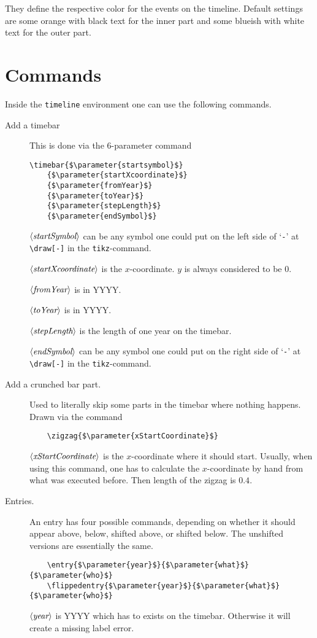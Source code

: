 \documentclass{article}
\newcommand{\parameter}[1]{\langle\normalfont\textit{#1}\rangle}
\begin{document}
They define the respective color for the events on the timeline.
Default settings are some orange  with black text for the inner part and some blueish  with white text for the outer part.

\section{Commands}
Inside the \texttt{timeline} environment one can use the following commands.
\begin{description}
	\item[Add a timebar] This is done via the 6-parameter command
\begin{lstlisting}
\timebar{$\parameter{startsymbol}$}
	{$\parameter{startXcoordinate}$}
	{$\parameter{fromYear}$}
	{$\parameter{toYear}$}
	{$\parameter{stepLength}$}
	{$\parameter{endSymbol}$}
\end{lstlisting}
		$\parameter{startSymbol}$ can be any symbol one could put on the left side of `\verb'-'' at \verb'\draw[-]' in the \texttt{tikz}-command.
		
		$\parameter{startXcoordinate}$ is the $x$-coordinate. $y$ is always considered to be $0$.
		
		$\parameter{fromYear}$ is in YYYY.
		
		$\parameter{toYear}$ is in YYYY.
		
		$\parameter{stepLength}$ is the length of one year on the timebar.
		
		$\parameter{endSymbol}$ can be any symbol one could put on the right side of `\verb'-'' at \verb'\draw[-]' in the \texttt{tikz}-command.
	\item[Add a crunched bar part.] Used to literally skip some parts in the timebar where nothing happens. Drawn via the command
\begin{lstlisting}
	\zigzag{$\parameter{xStartCoordinate}$}
\end{lstlisting}
$\parameter{xStartCoordinate}$ is the $x$-coordinate where it should start. Usually, when using this command, one has to calculate the $x$-coordinate by hand from what was executed before.
Then length of the zigzag is $0.4$.

\item[Entries.] An entry has four possible commands, depending on whether it should appear above, below, shifted above, or shifted below. The unshifted versions are essentially the same.
\begin{lstlisting}
	\entry{$\parameter{year}$}{$\parameter{what}$}{$\parameter{who}$}
	\flippedentry{$\parameter{year}$}{$\parameter{what}$}{$\parameter{who}$}
\end{lstlisting}
$\parameter{year}$ is YYYY which has to exists on the timebar. Otherwise it will create a missing label error.


\end{description}
\end{document}
